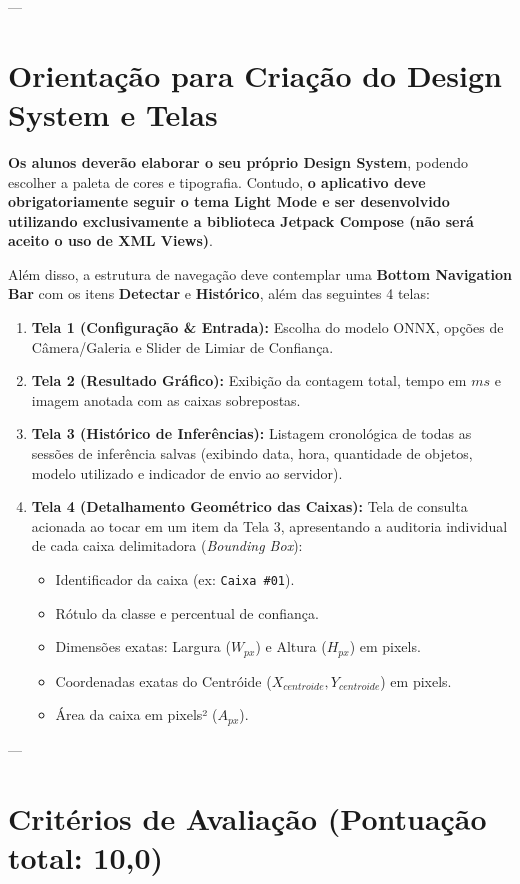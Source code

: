 \documentclass[12pt]{article}
\begin{document}
---

\newpage
\section{Orientação para Criação do Design System e Telas}

\textbf{Os alunos deverão elaborar o seu próprio Design System}, podendo escolher a paleta de cores e tipografia. Contudo, \textbf{o aplicativo deve obrigatoriamente seguir o tema Light Mode e ser desenvolvido utilizando exclusivamente a biblioteca Jetpack Compose (não será aceito o uso de XML Views)}. 

Além disso, a estrutura de navegação deve contemplar uma \textbf{Bottom Navigation Bar} com os itens \textbf{Detectar} e \textbf{Histórico}, além das seguintes 4 telas:

\begin{enumerate}
    \item \textbf{Tela 1 (Configuração \& Entrada):} Escolha do modelo ONNX, opções de Câmera/Galeria e Slider de Limiar de Confiança.
    \item \textbf{Tela 2 (Resultado Gráfico):} Exibição da contagem total, tempo em $ms$ e imagem anotada com as caixas sobrepostas.
    \item \textbf{Tela 3 (Histórico de Inferências):} Listagem cronológica de todas as sessões de inferência salvas (exibindo data, hora, quantidade de objetos, modelo utilizado e indicador de envio ao servidor).
    \item \textbf{Tela 4 (Detalhamento Geométrico das Caixas):} Tela de consulta acionada ao tocar em um item da Tela 3, apresentando a auditoria individual de cada caixa delimitadora (\textit{Bounding Box}):
    \begin{itemize}
        \item Identificador da caixa (ex: \texttt{Caixa \#01}).
        \item Rótulo da classe e percentual de confiança.
        \item Dimensões exatas: Largura ($W_{px}$) e Altura ($H_{px}$) em pixels.
        \item Coordenadas exatas do Centróide ($X_{centroide}, Y_{centroide}$) em pixels.
        \item Área da caixa em pixels² ($A_{px}$).
    \end{itemize}
\end{enumerate}

---

\section{Critérios de Avaliação (Pontuação total: 10,0)}
\end{document}
